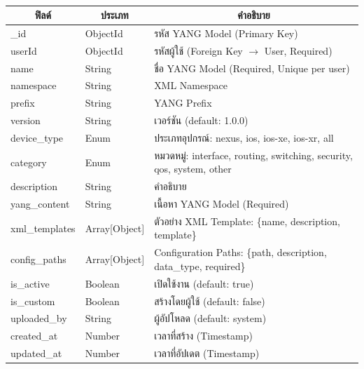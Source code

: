 \begin{table}[H]
    \caption{}
    \label{tab:yang-model-structure}
    \fontSixTeen 
    \begin{tabularx}{\textwidth}{|l|l|X|} 
        \hline
        \multicolumn{1}{|c|}{\textbf{ฟิลด์}} & \multicolumn{1}{c|}{\textbf{ประเภท}} & \multicolumn{1}{c|}{\textbf{คำอธิบาย}} \\
        \hline
        \_id & ObjectId & รหัส YANG Model (Primary Key) \\
        \hline
        userId & ObjectId & รหัสผู้ใช้ (Foreign Key $\rightarrow$ User, Required) \\
        \hline
        name & String & ชื่อ YANG Model (Required, Unique per user) \\
        \hline
        namespace & String & XML Namespace \\
        \hline
        prefix & String & YANG Prefix \\
        \hline
        version & String & เวอร์ชัน (default: 1.0.0) \\
        \hline
        device\_type & Enum & ประเภทอุปกรณ์: nexus, ios, ios-xe, ios-xr, all \\
        \hline
        category & Enum & หมวดหมู่: interface, routing, switching, security, qos, system, other \\
        \hline
        description & String & คำอธิบาย \\
        \hline
        yang\_content & String & เนื้อหา YANG Model (Required) \\
        \hline
        xml\_templates & Array[Object] & ตัวอย่าง XML Template: \{name, description, template\} \\
        \hline
        config\_paths & Array[Object] & Configuration Paths: \{path, description, data\_type, required\} \\
        \hline
        is\_active & Boolean & เปิดใช้งาน (default: true) \\
        \hline
        is\_custom & Boolean & สร้างโดยผู้ใช้ (default: false) \\
        \hline
        uploaded\_by & String & ผู้อัปโหลด (default: system) \\
        \hline
        created\_at & Number & เวลาที่สร้าง (Timestamp) \\
        \hline
        updated\_at & Number & เวลาที่อัปเดต (Timestamp) \\
        \hline
    \end{tabularx}
\end{table}

